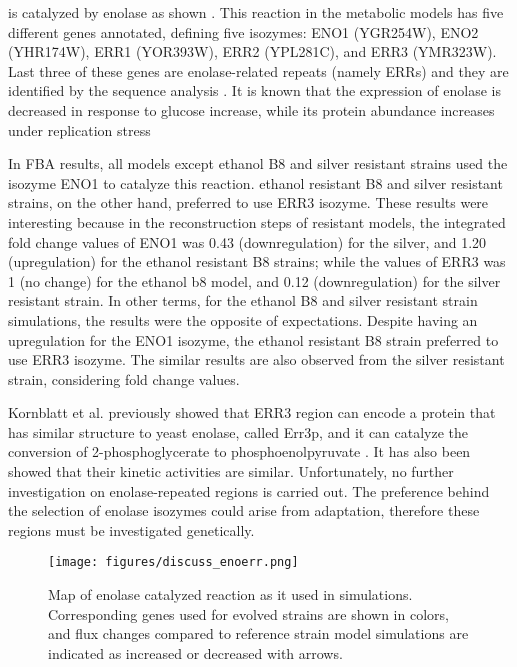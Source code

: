 \vspace{1cm}
\noindent is catalyzed by enolase as shown \cite{tkach2012dissecting}. This reaction in the metabolic models has five different genes annotated, defining five isozymes: ENO1 (YGR254W), ENO2 (YHR174W), ERR1 (YOR393W), ERR2 (YPL281C), and ERR3 (YMR323W). Last three of these genes are enolase-related repeats (namely ERRs) and they are identified by the sequence analysis \cite{pryde1995sequence}. It is known that the expression of enolase is decreased in response to glucose increase, while its protein abundance increases under replication stress

In FBA results, all models except ethanol B8 and silver resistant strains used the isozyme ENO1 to catalyze this reaction. ethanol resistant B8 and silver resistant strains, on the other hand, preferred to use ERR3 isozyme. These results were interesting because in the reconstruction steps of resistant models, the integrated fold change values of ENO1 was 0.43 (downregulation) for the silver, and 1.20 (upregulation) for the ethanol resistant B8 strains; while the values of ERR3 was 1 (no change) for the ethanol b8 model, and 0.12 (downregulation) for the silver resistant strain. In other terms, for the ethanol B8 and silver resistant strain simulations, the results were the opposite of expectations. Despite having an upregulation for the ENO1 isozyme, the ethanol resistant B8 strain preferred to use ERR3 isozyme. The similar results are also observed from the silver resistant strain, considering fold change values.

Kornblatt et al. previously showed that ERR3 region can encode a protein that has similar structure to yeast enolase, called Err3p, and it can catalyze the conversion of 2-phosphoglycerate to phosphoenolpyruvate \cite{kornblatt2013saccharomyces}. It has also been showed that their kinetic activities are similar. Unfortunately, no further investigation on enolase-repeated regions is carried out. The preference behind the selection of enolase isozymes could arise from adaptation, therefore these regions must be investigated genetically.

\begin{figure}[H]
\texttt{[image: figures/discuss\_enoerr.png]}
\caption[Map of enolase catalyzed reaction as it used in simulations]{Map of enolase catalyzed reaction as it used in simulations. Corresponding genes used for evolved strains are shown in colors, and flux changes compared to reference strain model simulations are indicated as increased or decreased with arrows.}
\label{fig:discuss_ENOERR}
\end{figure}

